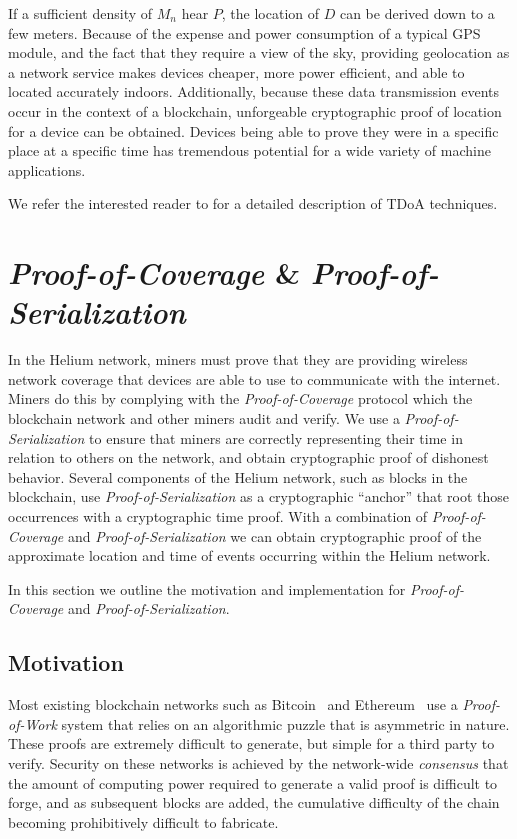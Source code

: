 \documentclass[UTF8, 10pt, nonatbib, nocopyrightspace, reprint]{sigplanconf}
\begin{document}
If a sufficient density of $M_n$ hear $P$, the location of $D$ can be derived down to a few meters. Because of the expense and power consumption of a typical GPS module, and the fact that they require a view of the sky, providing geolocation as a network service makes devices cheaper, more power efficient, and able to located accurately indoors. Additionally, because these data transmission events occur in the context of a blockchain, unforgeable cryptographic proof of location for a device can be obtained. Devices being able to prove they were in a specific place at a specific time has tremendous potential for a wide variety of machine applications.

We refer the interested reader to\cite{tdoa} for a detailed description of TDoA techniques.

\section{\emph{Proof-of-Coverage} \& \emph{Proof-of-Serialization}}\label{poc}

In the Helium network, miners must prove that they are providing wireless network coverage that devices are able to use to communicate with the internet. Miners do this by complying with the \emph{Proof-of-Coverage} protocol which the blockchain network and other miners audit and verify. We use a \emph{Proof-of-Serialization} to ensure that miners are correctly representing their time in relation to others on the network, and obtain cryptographic proof of dishonest behavior. Several components of the Helium network, such as blocks in the blockchain, use \emph{Proof-of-Serialization} as a cryptographic ``anchor'' that root those occurrences  with a cryptographic time proof. With a combination of \emph{Proof-of-Coverage} and \emph{Proof-of-Serialization} we can obtain cryptographic proof of the approximate location and time of events occurring within the Helium network.

In this section we outline the motivation and implementation for \emph{Proof-of-Coverage} and \emph{Proof-of-Serialization}.

\subsection{Motivation}

Most existing blockchain networks such as Bitcoin~\cite{bitcoin} and Ethereum~\cite{ethereum} use a \emph{Proof-of-Work} system that relies on an algorithmic puzzle that is asymmetric in nature. These proofs are extremely difficult to generate, but simple for a third party to verify. Security on these networks is achieved by the network-wide \emph{consensus} that the amount of computing power required to generate a valid proof is difficult to forge, and as subsequent blocks are added, the cumulative difficulty of the chain becoming prohibitively difficult to fabricate.
\end{document}
